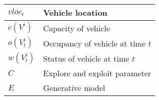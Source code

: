 \begin{table}[!t]
\begin{tabularx}{0.49\textwidth}{|l|X|}
$vloc_t$                  & Vehicle location                                                                              \\ \hline
$c(V^i)$                  & Capacity of vehicle                                                                           \\ \hline\rowcolor{Gray}
$o(V^i_t)$                & Occupancy of vehicle at time $t$                                                              \\ \hline
$w(V^i_t)$                & Status of vehicle at time $t$                                                                 \\ \hline\rowcolor{Gray}
$C$                       & Explore and exploit parameter                                                                 \\ \hline
$E$                       & Generative model                       \\ \hline
\end{tabularx}%
\label{tab:symbols}
\end{table}